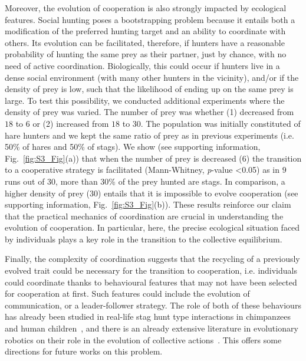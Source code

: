   Moreover, the evolution of cooperation is also strongly impacted by ecological features. Social hunting poses a bootstrapping problem because it entails both a modification of the preferred hunting target and an ability to coordinate with others. Its evolution can be facilitated, therefore, if hunters have a reasonable probability of hunting the same prey as their partner, just by chance, with no need of active coordination. Biologically, this could occur if hunters live in a dense social environment (with many other hunters in the vicinity), and/or if the density of prey is low, such that the likelihood of ending up on the same prey is large. To test this possibility, we conducted additional experiments where the density of prey was varied. The number of prey was whether (1) decreased from $18$ to $6$ or (2) increased from $18$ to $30$. The population was initially constituted of hare hunters and we kept the same ratio of prey as in previous experiments (i.e. 50\% of hares and 50\% of stags). We show (see supporting information, Fig.~\ref{fig:S3_Fig}(a)) that when the number of prey is decreased ($6$) the transition to a cooperative strategy is facilitated (Mann-Whitney, {\em p}-value \textless 0.05) as in $9$ runs out of $30$, more than $30$\% of the prey hunted are stags. In comparison, a higher density of prey ($30$) entails that it is impossible to evolve cooperation (see supporting information, Fig.~\ref{fig:S3_Fig}(b)). These results reinforce our claim that the practical mechanics of coordination are crucial in understanding the evolution of cooperation. In particular, here, the precise ecological situation faced by individuals plays a key role in the transition to the collective equilibrium.

  Finally, the complexity of coordination suggests that the recycling of a previously evolved trait could be necessary for the transition to cooperation, i.e. individuals could coordinate thanks to behavioural features that may not have been selected for cooperation at first. Such features could include the evolution of communication, or a leader-follower strategy. The role of both of these behaviours has already been studied in real-life stag hunt type interactions in chimpanzees and human children~\parencite{Bullinger2011, Duguid2014}, and there is an already extensive literature in evolutionary robotics on their role in the evolution of collective actions~\parencite{Trianni2007, Mitri2009, Solomon2012, Ferrante2015}. This offers some directions for future works on this problem.



